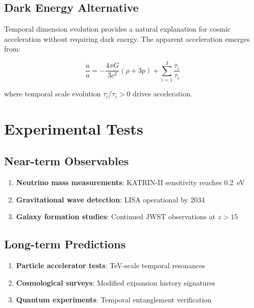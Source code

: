 \documentclass[reprint,amsmath,amssymb,aps,prd,nofootinbib]{revtex4-2}
\begin{document}
\subsection{Dark Energy Alternative}

Temporal dimension evolution provides a natural explanation for cosmic acceleration without requiring dark energy. The apparent acceleration emerges from:

\begin{equation}
\frac{\ddot{a}}{a} = -\frac{4\pi G}{3c^2}(\rho + 3p) + \sum_{i=1}^{3}\frac{\ddot{\tau_i}}{\tau_i}
\label{eq:temporal_acceleration}
\end{equation}

where temporal scale evolution $\ddot{\tau_i}/\tau_i > 0$ drives acceleration.

\section{Experimental Tests}\label{sec:tests}

\subsection{Near-term Observables}

\begin{enumerate}
\item \textbf{Neutrino mass measurements}: KATRIN-II sensitivity reaches \SI{0.2}{\electronvolt}
\item \textbf{Gravitational wave detection}: LISA operational by 2034
\item \textbf{Galaxy formation studies}: Continued JWST observations at $z > 15$
\end{enumerate}

\subsection{Long-term Predictions}

\begin{enumerate}
\item \textbf{Particle accelerator tests}: TeV-scale temporal resonances
\item \textbf{Cosmological surveys}: Modified expansion history signatures
\item \textbf{Quantum experiments}: Temporal entanglement verification
\end{enumerate}
\end{document}
